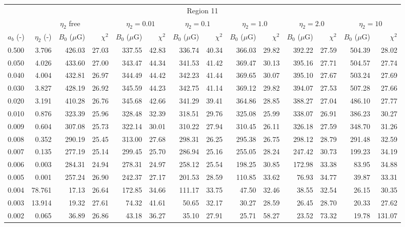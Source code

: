 \begin{tabular}{@{}lrrrrrrrrrrrrr@{}}
\toprule
\multicolumn{14}{c}{Region 11} \\
\cmidrule{1-14}
{} & \multicolumn{3}{c}{$\eta_2$ free} & \multicolumn{2}{c}{$\eta_2 = 0.01$}
   & \multicolumn{2}{c}{$\eta_2 = 0.1$} & \multicolumn{2}{c}{$\eta_2 = 1.0$}
   & \multicolumn{2}{c}{$\eta_2 = 2.0$} & \multicolumn{2}{c}{$\eta_2 = 10$} \\
\cmidrule(lr){2-4} \cmidrule(lr){5-6} \cmidrule(lr){7-8} \cmidrule(lr){9-10}
    \cmidrule(lr){11-12} \cmidrule(lr){13-14}
$a_b$ (-) & $\eta_2$ (-) & $B_0$ ($\mu$G) & $\chi^2$
& $B_0$ ($\mu$G) & $\chi^2$ & $B_0$ ($\mu$G) & $\chi^2$
& $B_0$ ($\mu$G) & $\chi^2$ & $B_0$ ($\mu$G) & $\chi^2$
& $B_0$ ($\mu$G) & $\chi^2$ \\
\cmidrule{1-14}
0.500 & 3.706 & 426.03 & 27.03 & 337.55 & 42.83 & 336.74 & 40.34 & 366.03 & 29.82 & 392.22 & 27.59 & 504.39 & 28.02 \\
0.050 & 4.026 & 433.60 & 27.00 & 343.47 & 44.34 & 341.53 & 41.42 & 369.47 & 30.13 & 395.16 & 27.71 & 504.57 & 27.74 \\
0.040 & 4.004 & 432.81 & 26.97 & 344.49 & 44.42 & 342.23 & 41.44 & 369.65 & 30.07 & 395.10 & 27.67 & 503.24 & 27.69 \\
0.030 & 3.827 & 428.19 & 26.92 & 345.59 & 44.23 & 342.75 & 41.14 & 369.12 & 29.82 & 394.07 & 27.53 & 507.28 & 27.66 \\
0.020 & 3.191 & 410.28 & 26.76 & 345.68 & 42.66 & 341.29 & 39.41 & 364.86 & 28.85 & 388.27 & 27.04 & 486.10 & 27.77 \\
0.010 & 0.876 & 323.39 & 25.96 & 328.48 & 32.39 & 318.51 & 29.76 & 325.08 & 25.99 & 338.07 & 26.91 & 386.23 & 30.27 \\
0.009 & 0.604 & 307.08 & 25.73 & 322.14 & 30.01 & 310.22 & 27.94 & 310.45 & 26.11 & 326.18 & 27.59 & 348.70 & 31.26 \\
0.008 & 0.352 & 290.19 & 25.45 & 313.00 & 27.68 & 298.31 & 26.25 & 295.38 & 26.75 & 298.12 & 28.79 & 291.48 & 32.59 \\
0.007 & 0.135 & 277.19 & 25.14 & 299.45 & 25.70 & 286.94 & 25.16 & 255.05 & 28.24 & 247.42 & 30.73 & 199.23 & 34.19 \\
0.006 & 0.003 & 284.31 & 24.94 & 278.31 & 24.97 & 258.12 & 25.54 & 198.25 & 30.85 & 172.98 & 33.38 & 83.95 & 34.88 \\
0.005 & 0.001 & 257.24 & 26.90 & 242.37 & 27.17 & 201.53 & 28.59 & 110.85 & 33.62 & 76.93 & 34.77 & 39.87 & 33.31 \\
0.004 & 78.761 & 17.13 & 26.64 & 172.85 & 34.66 & 111.17 & 33.75 & 47.50 & 32.46 & 38.55 & 32.54 & 26.15 & 30.35 \\
0.003 & 13.914 & 19.32 & 27.61 & 74.32 & 41.61 & 50.65 & 32.17 & 30.27 & 28.59 & 26.45 & 28.70 & 20.33 & 27.62 \\
0.002 & 0.065 & 36.89 & 26.86 & 43.18 & 36.27 & 35.10 & 27.91 & 25.71 & 58.27 & 23.52 & 73.32 & 19.78 & 131.07 \\


\end{tabular}
